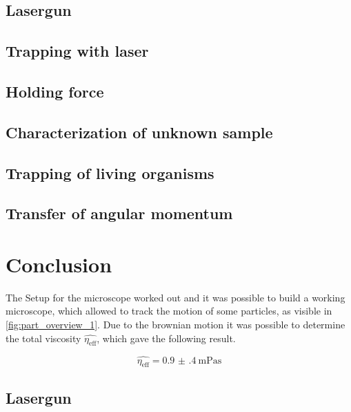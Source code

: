 \documentclass[12pt,english]{scrartcl}
\begin{document}
\subsection{Lasergun}

\subsection{Trapping with laser}

\subsection{Holding force}

\subsection{Characterization of unknown sample}

\subsection{Trapping of living organisms}

\subsection{Transfer of angular momentum}




\section{Conclusion}\label{sec:zusammenfassung}


The Setup for the microscope worked out and it was possible to build a working microscope, which allowed to track the motion of 
some particles, as visible in \autoref{fig:part_overview_1}. Due to the brownian motion it was possible to determine the total
viscosity $\hat{\eta_\text{eff}}$, which gave the following result.

\begin{equation*}
	\hat{\eta_\text{eff}} = \SI{0.9(4)}{\milli\pascal\second}
\end{equation*}


\subsection{Lasergun}
\end{document}
